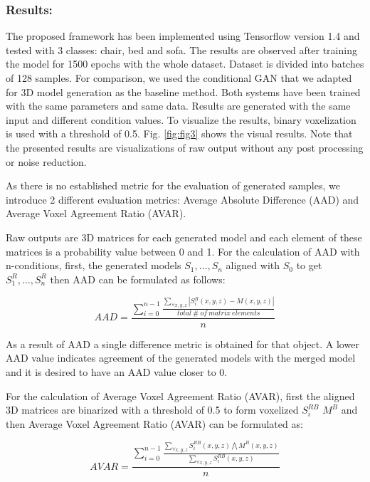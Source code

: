 \documentclass[runningheads]{llncs}
\begin{document}
\subsubsection{Results:} The proposed framework has been implemented using Tensorflow \cite{tensorflow2015-whitepaper} version 1.4 and tested with 3 classes: chair, bed and sofa. The results are observed after training the model for 1500 epochs with the whole dataset. Dataset is divided into batches of 128 samples. For comparison, we used the conditional GAN that we adapted for 3D model generation as the baseline method. Both systems have been trained with the same parameters and same data. Results are generated with the same input and different condition values. To visualize the results, binary voxelization is used with a threshold of 0.5. Fig. \ref{fig:fig3} shows the visual results. Note that the presented results are visualizations of raw output without any post processing or noise reduction.

As there is no established metric for the evaluation of generated samples, we introduce 2 different evaluation metrics: Average Absolute Difference (AAD) and Average Voxel Agreement Ratio (AVAR). 

Raw outputs are 3D matrices for each generated model and each element of these matrices is a probability value between 0 and 1. For the calculation of AAD with n-conditions, first, the generated models $S_1,\dotsc, S_n$ aligned with $S_0$ to get $S^R_1,\dotsc, S^R_n$  then AAD can be formulated as follows:

\begin{equation}
AAD = \frac{\sum_{i=0}^{n-1}\frac{\sum_{\forall x,y,z}|S_{i}^{R}(x,y,z)-M(x,y,z)|}{total~\#~of~matrix~elements}}{n}
\end{equation}

As a result of AAD a single difference metric is obtained for that object. A lower AAD value indicates agreement of the generated models with the merged model and it is desired to have an AAD value closer to 0. 

For the calculation of Average Voxel Agreement Ratio (AVAR), first the aligned 3D matrices are binarized with a threshold of 0.5 to form voxelized  $S^{RB}_i$ $M^B$ and  then Average Voxel Agreement Ratio (AVAR) can be formulated as:

\begin{equation}
AVAR = \frac{\sum_{i=0}^{n-1}\frac{\sum_{\forall x,y,z}S_{i}^{RB}(x,y,z)\bigwedge M^{B}(x,y,z)}{\sum_{\forall x,y,z}S_{i}^{RB}(x,y,z)}}{n}
\end{equation}
\end{document}
